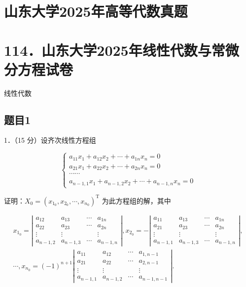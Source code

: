 \documentclass{article}
\begin{document}
\section*{山东大学2025年高等代数真题}
\section*{114．山东大学2025年线性代数与常微分方程试卷}
线性代数\\

\subsection{题目1}
1．（15 分）设齐次线性方程组

\[
\left\{\begin{array}{c}
a_{11} x_{1}+a_{12} x_{2}+\cdots+a_{1 n} x_{n}=0 \\
a_{21} x_{1}+a_{22} x_{2}+\cdots+a_{2 n} x_{n}=0 \\
\cdots \cdots \\
a_{n-1,1} x_{1}+a_{n-1,2} x_{2}+\cdots+a_{n-1, n} x_{n}=0
\end{array}\right.
\]

证明：\(X_{0}=\left(x_{1_{0}}, x_{2_{0}}, \cdots, x_{n_{0}}\right)^{\mathrm{T}}\) 为此方程组的解，其中

\[
\begin{gathered}
x_{1_{0}}=\left|\begin{array}{cccc}
a_{12} & a_{13} & \cdots & a_{1 n} \\
a_{22} & a_{23} & \cdots & a_{2 n} \\
\vdots & \vdots & & \vdots \\
a_{n-1,2} & a_{n-1,3} & \cdots & a_{n-1, n}
\end{array}\right|, x_{2_{0}}=-\left|\begin{array}{cccc}
a_{11} & a_{13} & \cdots & a_{1 n} \\
a_{21} & a_{23} & \cdots & a_{2 n} \\
\vdots & \vdots & & \vdots \\
a_{n-1,1} & a_{n-1,3} & \cdots & a_{n-1, n}
\end{array}\right|, \\
\cdots, x_{n_{0}}=(-1)^{n+1}\left|\begin{array}{cccc}
a_{11} & a_{12} & \cdots & a_{1, n-1} \\
a_{21} & a_{22} & \cdots & a_{2, n-1} \\
\vdots & \vdots & & \vdots \\
a_{n-1,1} & a_{n-1,2} & \cdots & a_{n-1, n-1}
\end{array}\right| .
\end{gathered}
\]
\end{document}

